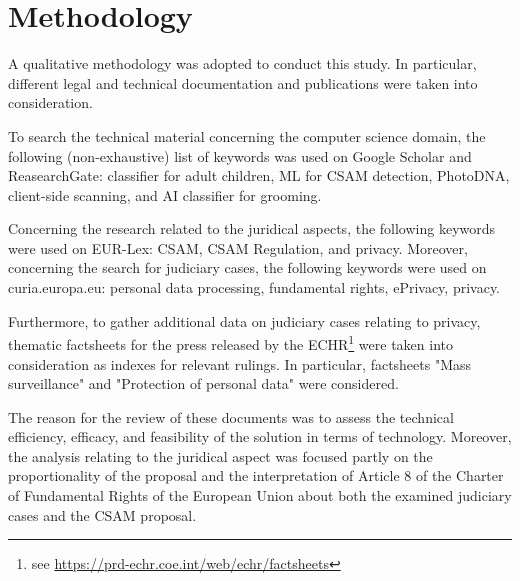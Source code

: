\section{Methodology}

A qualitative methodology was adopted to conduct this study. In particular, different legal and technical documentation and publications were taken into consideration.

To search the technical material concerning the computer science domain, the following (non-exhaustive) list of keywords was used on Google Scholar and ReasearchGate: classifier for adult children, ML for CSAM detection, PhotoDNA, client-side scanning, and AI classifier for grooming.

Concerning the research related to the juridical aspects, the following keywords were used on EUR-Lex: CSAM, CSAM Regulation, and privacy. Moreover, concerning the search for judiciary cases, the following keywords were used on curia.europa.eu: personal data processing, fundamental rights, ePrivacy, privacy.

Furthermore, to gather additional data on judiciary cases relating to privacy, thematic factsheets for the press released by the ECHR\footnote{see \url{https://prd-echr.coe.int/web/echr/factsheets}} were taken into consideration as indexes for relevant rulings. In particular, factsheets "Mass surveillance" and "Protection of personal data" were considered.

The reason for the review of these documents was to assess the technical efficiency, efficacy, and feasibility of the solution in terms of technology. Moreover, the analysis relating to the juridical aspect was focused partly on the proportionality of the proposal and the interpretation of Article 8 of the Charter of Fundamental Rights of the European Union about both the examined judiciary cases and the CSAM proposal.

